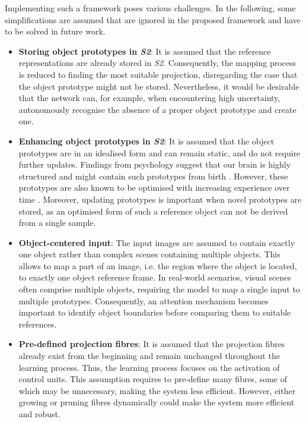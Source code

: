 Implementing such a framework poses various challenges.
In the following, some simplifications are assumed that are ignored in the proposed framework and have to be solved in future work.
\begin{itemize}
    \item \textbf{Storing object prototypes in \emph{S2}}: It is assumed that the reference representations are already stored in \emph{S2}. Consequently, the mapping process is reduced to finding the most suitable projection, disregarding the case that the object prototype might not be stored. Nevertheless, it would be desirable that the network can, for example, when encountering high uncertainty, autonomously recognise the absence of a proper object prototype and create one.
    \item \textbf{Enhancing object prototypes in \emph{S2}}: It is assumed that the object prototypes are in an idealised form and can remain static, and do not require further updates. 
    Findings from psychology suggest that our brain is highly structured and might contain such prototypes from birth . However, these prototypes are also known to be optimised with increasing experience over time \cite{simion_face_2015}.
    Moreover, updating prototypes is important when novel prototypes are stored, as an optimised form of such a reference object can not be derived from a single sample.
    \item \textbf{Object-centered input}: The input images are assumed to contain exactly one object rather than complex scenes containing multiple objects. This allows to map a part of an image, i.e. the region where the object is located, to exactly one object reference frame. In real-world scenarios, visual scenes often comprise multiple objects, requiring the model to map a single input to multiple prototypes. Consequently, an attention mechanism becomes important to identify object boundaries before comparing them to suitable references.
    \item \textbf{Pre-defined projection fibres}: It is assumed that the projection fibres already exist from the beginning and remain unchanged throughout the learning process. Thus, the learning process focuses on the activation of control units. This assumption requires to pre-define many fibres, some of which may be unnecessary, making the system less efficient. However, either growing or pruning fibres dynamically could make the system more efficient and robust.
\end{itemize}

